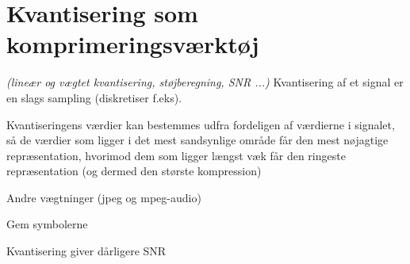 \newpage
\section{Kvantisering som komprimeringsværktøj}
\textit{(lineær og vægtet kvantisering, støjberegning, SNR ...)}
Kvantisering af et signal er en slags sampling (diskretiser f.eks).

Kvantiseringens værdier kan bestemmes udfra fordeligen af værdierne i
signalet, så de værdier som ligger i det mest sandsynlige område får
den mest nøjagtige repræsentation, hvorimod dem som ligger længst væk
får den ringeste repræsentation (og dermed den største kompression)

Andre vægtninger (jpeg og mpeg-audio)

Gem symbolerne

Kvantisering giver dårligere SNR
